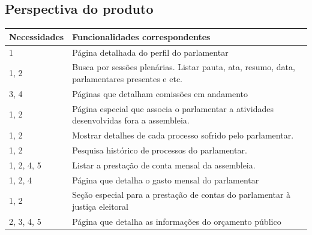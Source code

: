 \documentclass[12pt, a4paper]{article}
\begin{document}
        \subsection{Perspectiva do produto}

            \begin{longtabu}{X[-1, r]| X}
                \hline
                \textbf{Necessidades} &
                \textbf{Funcionalidades correspondentes}
                \\ \hline

                1 &
                Página detalhada do perfil do parlamentar
                \\ \hline

                1, 2 &
                Busca por sessões plenárias. Listar pauta, ata, resumo, data,
                parlamentares presentes e etc.
                \\ \hline

                3, 4 &
                Páginas que detalham comissões em andamento
                \\ \hline

                1, 2 &
                Página especial que associa o parlamentar a atividades
                desenvolvidas fora a assembleia.
                \\ \hline

                1, 2 &
                Mostrar detalhes de cada processo sofrido pelo parlamentar.
                \\ \hline

                1, 2 &
                Pesquisa histórico de processos do parlamentar.
                \\ \hline

                1, 2, 4, 5 &
                Listar a prestação de conta mensal da assembleia.
                \\ \hline

                1, 2, 4 &
                Página que detalha o gasto mensal do parlamentar
                \\ \hline

                1, 2 &
                Seção especial para a prestação de contas do parlamentar à
                justiça eleitoral
                \\ \hline

                2, 3, 4, 5 &
                Página que detalha as informações do orçamento público
                \\ \hline


\end{longtabu}
\end{document}
